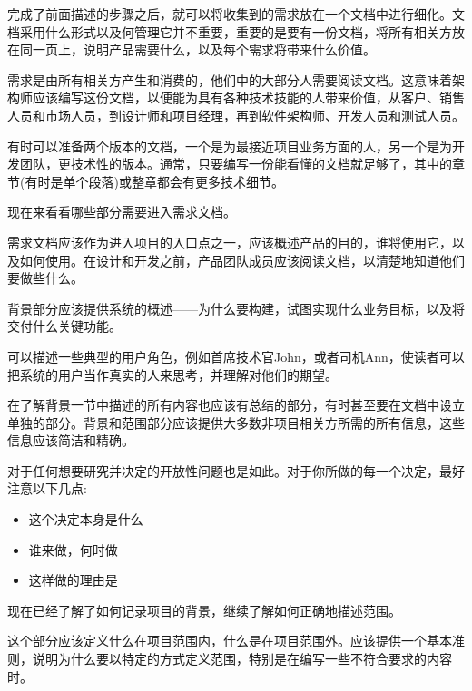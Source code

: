 
完成了前面描述的步骤之后，就可以将收集到的需求放在一个文档中进行细化。文档采用什么形式以及何管理它并不重要，重要的是要有一份文档，将所有相关方放在同一页上，说明产品需要什么，以及每个需求将带来什么价值。

需求是由所有相关方产生和消费的，他们中的大部分人需要阅读文档。这意味着架构师应该编写这份文档，以便能为具有各种技术技能的人带来价值，从客户、销售人员和市场人员，到设计师和项目经理，再到软件架构师、开发人员和测试人员。

有时可以准备两个版本的文档，一个是为最接近项目业务方面的人，另一个是为开发团队，更技术性的版本。通常，只要编写一份能看懂的文档就足够了，其中的章节(有时是单个段落)或整章都会有更多技术细节。

现在来看看哪些部分需要进入需求文档。


需求文档应该作为进入项目的入口点之一，应该概述产品的目的，谁将使用它，以及如何使用。在设计和开发之前，产品团队成员应该阅读文档，以清楚地知道他们要做些什么。

背景部分应该提供系统的概述——为什么要构建，试图实现什么业务目标，以及将交付什么关键功能。 

可以描述一些典型的用户角色，例如首席技术官John，或者司机Ann，使读者可以把系统的用户当作真实的人来思考，并理解对他们的期望。

在了解背景一节中描述的所有内容也应该有总结的部分，有时甚至要在文档中设立单独的部分。背景和范围部分应该提供大多数非项目相关方所需的所有信息，这些信息应该简洁和精确。

对于任何想要研究并决定的开放性问题也是如此。对于你所做的每一个决定，最好注意以下几点:

\begin{itemize}
\item 
这个决定本身是什么

\item 
谁来做，何时做

\item 
这样做的理由是
\end{itemize}

现在已经了解了如何记录项目的背景，继续了解如何正确地描述范围。


这个部分应该定义什么在项目范围内，什么是在项目范围外。应该提供一个基本准则，说明为什么要以特定的方式定义范围，特别是在编写一些不符合要求的内容时。

